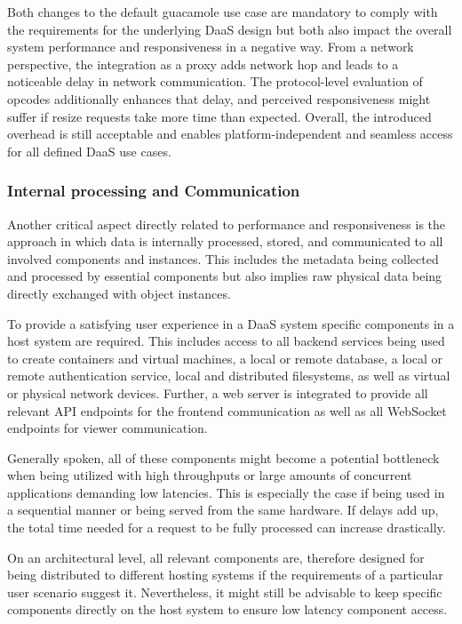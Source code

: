 \documentclass[runningheads]{llncs}
\begin{document}
Both changes to the default guacamole use case are mandatory
to comply with the requirements for the underlying DaaS design
but both also impact the overall system performance and responsiveness in a negative way.
From a network perspective, the integration as a proxy adds network hop
and leads to a noticeable delay in network communication.
The protocol-level evaluation of opcodes additionally enhances that delay, and perceived responsiveness might suffer if resize requests take more time than expected.
Overall, the introduced overhead is still acceptable
and enables platform-independent and seamless access for all defined DaaS use cases.

\subsubsection{Internal processing and Communication}
Another critical aspect directly related to performance and responsiveness
is the approach in which data is internally processed, stored, and communicated
to all involved components and instances.
This includes the metadata being collected and processed by essential components
but also implies raw physical data being directly exchanged with object instances.

To provide a satisfying user experience in a DaaS system
specific components in a host system are required.
This includes access to all backend services
being used to create containers and virtual machines,
a local or remote database, a local or remote authentication service,
local and distributed filesystems, as well as
virtual or physical network devices.
Further, a web server is integrated to provide all relevant API endpoints
for the frontend communication
as well as all WebSocket endpoints for viewer communication.

Generally spoken, all of these components might become a potential bottleneck
when being utilized with high throughputs
or large amounts of concurrent applications demanding low latencies.
This is especially the case if being used in a sequential manner
or being served from the same hardware.
If delays add up, the total time needed for a request to be fully processed can increase drastically.

On an architectural level, all relevant components are, therefore designed
for being distributed to different hosting systems
if the requirements of a particular user scenario suggest it.
Nevertheless, it might still be advisable
to keep specific components directly on the host system
to ensure low latency component access.
\end{document}
